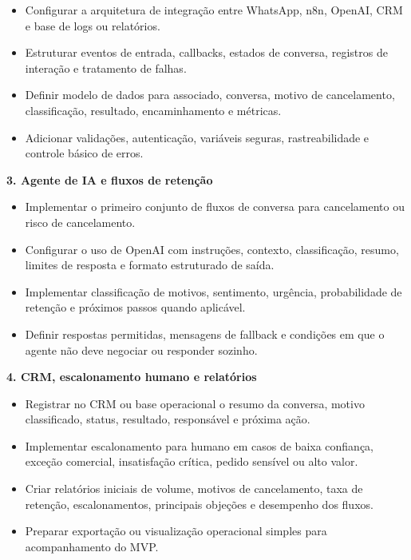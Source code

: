 \documentclass[11pt,a4paper]{article}
\begin{document}
\begin{itemize}
\item Configurar a arquitetura de integração entre WhatsApp, n8n, OpenAI, CRM e base de logs ou relatórios.
\item Estruturar eventos de entrada, callbacks, estados de conversa, registros de interação e tratamento de falhas.
\item Definir modelo de dados para associado, conversa, motivo de cancelamento, classificação, resultado, encaminhamento e métricas.
\item Adicionar validações, autenticação, variáveis seguras, rastreabilidade e controle básico de erros.
\end{itemize}

\textbf{3. Agente de IA e fluxos de retenção}\par

\begin{itemize}
\item Implementar o primeiro conjunto de fluxos de conversa para cancelamento ou risco de cancelamento.
\item Configurar o uso de OpenAI com instruções, contexto, classificação, resumo, limites de resposta e formato estruturado de saída.
\item Implementar classificação de motivos, sentimento, urgência, probabilidade de retenção e próximos passos quando aplicável.
\item Definir respostas permitidas, mensagens de fallback e condições em que o agente não deve negociar ou responder sozinho.
\end{itemize}

\textbf{4. CRM, escalonamento humano e relatórios}\par

\begin{itemize}
\item Registrar no CRM ou base operacional o resumo da conversa, motivo classificado, status, resultado, responsável e próxima ação.
\item Implementar escalonamento para humano em casos de baixa confiança, exceção comercial, insatisfação crítica, pedido sensível ou alto valor.
\item Criar relatórios iniciais de volume, motivos de cancelamento, taxa de retenção, escalonamentos, principais objeções e desempenho dos fluxos.
\item Preparar exportação ou visualização operacional simples para acompanhamento do MVP.
\end{itemize}
\end{document}
